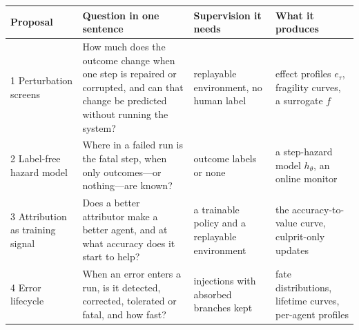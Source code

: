 \medskip\noindent\begin{minipage}{\linewidth}\centering\small
\begin{tabularx}{\linewidth}{@{}l >{\RaggedRight\hsize=1.35\hsize}X >{\RaggedRight\hsize=0.75\hsize}X >{\RaggedRight\hsize=0.9\hsize}X@{}}\toprule
Proposal & Question in one sentence & Supervision it needs & What it produces \\\midrule
1 Perturbation screens & How much does the outcome change when one step is repaired or corrupted, and can that change be predicted without running the system? & replayable environment, no human label & effect profiles $e_\tau$, fragility curves, a surrogate $f$ \\
2 Label-free hazard model & Where in a failed run is the fatal step, when only outcomes---or nothing---are known? & outcome labels or none & a step-hazard model $h_\theta$, an online monitor \\
3 Attribution as training signal & Does a better attributor make a better agent, and at what accuracy does it start to help? & a trainable policy and a replayable environment & the accuracy-to-value curve, culprit-only updates \\
4 Error lifecycle & When an error enters a run, is it detected, corrected, tolerated or fatal, and how fast? & injections with absorbed branches kept & fate distributions, lifetime curves, per-agent profiles \\\bottomrule
\end{tabularx}
\label{tab:roadmap}
\end{minipage}\medskip






\clearpage


